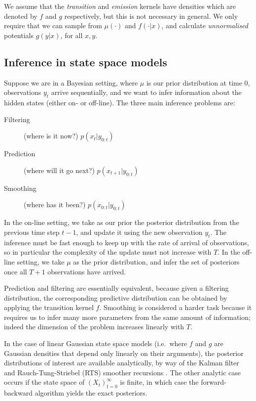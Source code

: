 \documentclass[fleqn]{article}
\begin{document}
We assume that the \emph{transition} and \emph{emission} kernels have densities which are denoted by $f$ and $g$ respectively, but this is not necessary in general.
We only require that we can sample from $\mu(\cdot)$ and $f(\cdot | x)$, and calculate \emph{unnormalised} potentials $g(y|x)$, for all $x,y$.

\subsection{Inference in state space models}
Suppose we are in a Bayesian setting, where $\mu$ is our prior distribution at time 0, observations $y_t$ arrive sequentially, and we want to infer information about the hidden states (either on- or off-line).
The three main inference problems are:
\begin{description}
\item[Filtering] (where is it now?) $p(x_{t} | y_{0:t})$
\item[Prediction] (where will it go next?) $p(x_{t+1} | y_{0:t})$
\item[Smoothing] (where has it been?) $p(x_{0:t} | y_{0:t})$
\end{description}
In the on-line setting, we take as our prior the posterior distribution from the previous time step $t-1$, and update it using the new observation $y_t$. The inference must be fast enough to keep up with the rate of arrival of observations, so in particular the complexity of the update must not increase with $T$.
In the off-line setting, we take $\mu$ as the prior distribution, and infer the set of posteriors once all $T+1$ observations have arrived.

Prediction and filtering are essentially equivalent, because given a filtering distribution, the corresponding predictive distribution can be obtained by applying the transition kernel $f$.
Smoothing is considered a harder task because it requires us to infer many more parameters from the same amount of information; indeed the dimension of the problem increases linearly with $T$.

In the case of linear Gaussian state space models (i.e.\ where $f$ and $g$ are Gaussian densities that depend only linearly on their arguments), the posterior distributions of interest are available analytically, by way of the Kalman filter \citep{kalman1960} and Rauch-Tung-Striebel (RTS) smoother recursions \citep{rauch1965}.
The other analytic case occurs if the state space of $(X_t)_{t=0}^\infty$ is finite, in which case the forward-backward algorithm \citep{baum1972} yields the exact posteriors.
\end{document}
